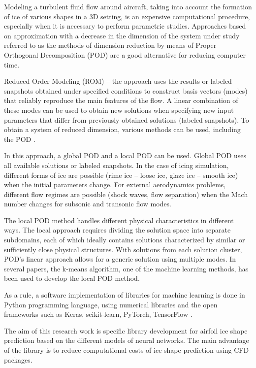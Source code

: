 \documentclass[aerospace,article,submit,moreauthors,pdftex]{Definitions/mdpi}
\begin{document}
Modeling a turbulent fluid flow around aircraft, taking into account the formation of ice of various shapes in a 3D setting, is an expensive computational procedure, especially when it is necessary to perform parametric studies. Approaches based on approximation with a decrease in the dimension of the system under study referred to as the methods of dimension reduction by means of Proper Orthogonal Decomposition (POD) are a good alternative for reducing computer time. 

Reduced Order Modeling (ROM) -- the approach uses the results or labeled snapshots obtained under specified conditions to construct basis vectors (modes) that reliably reproduce the main features of the flow. A linear combination of these modes can be used to obtain new solutions when specifying new input parameters that differ from previously obtained solutions (labeled snapshots). To obtain a system of reduced dimension, various methods can be used, including the POD 
\cite{ZhanHabashiFossati2015,ZhanHabashiFossati2016}.

In this approach, a global POD and a local POD can be used. Global POD uses all available solutions or labeled snapshots. In the case of icing simulation, different forms of ice are possible (rime ice -- loose ice, glaze ice -- smooth ice) when the initial parameters change. For external aerodynamics problems, different flow regimes are possible (shock waves, flow separation) when the Mach number changes for subsonic and transonic flow modes. 

The local POD method handles different physical characteristics in different ways. The local approach requires dividing the solution space into separate subdomains, each of which ideally contains solutions characterized by similar or sufficiently close physical structures. With solutions from each solution cluster, POD's linear approach allows for a generic solution using multiple modes. In several papers, the k-means algorithm, one of the machine learning methods, has been used to develop the local POD method.

As a rule, a software implementation of libraries for machine learning is done in Python programming language, using numerical libraries and the open frameworks such as Keras, scikit-learn, PyTorch, TensorFlow \cite{TensorFlow}.

The aim of this research work is specific library development for airfoil ice shape prediction based on the different models of neural networks. The main advantage of the library is to reduce computational costs of ice shape prediction using CFD packages.  
\end{document}
